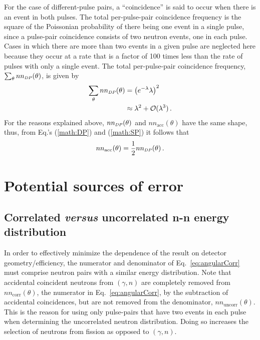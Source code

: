\documentclass[%
 reprint,
 amsmath,amssymb,
 aps,
 nofootinbib
]{revtex4-1}
\begin{document}
For the case of different-pulse pairs, a ``coincidence'' is said to occur when there is an event in both pulses.
The total per-pulse-pair coincidence frequency is the square of the Poissonian probability of there being one event in a single pulse, since a pulse-pair coincidence consists of two neutron events, one in each pulse.
Cases in which there are more than two events in a given pulse are neglected here because they occur at a rate that is a factor of 100 times less than the rate of pulses with only a single event.
The total per-pulse-pair coincidence frequency, $\sum_{\theta} nn_{\scaleto{DP}{4pt}}(\theta)$, is given by 
\begin{equation} \label{math:DP}
    \begin{split}
   \sum_{\theta} nn_{\scaleto{DP}{4pt}}(\theta)&= \left(e^{-\lambda}\lambda\right)^{2} \\
    &\approx \lambda^2 + \mathcal{O}(\lambda^3) \, .
    \end{split}
\end{equation}
For the reasons explained above, $nn_{\scaleto{DP}{4pt}}(\theta)$ and $nn_{\text{acc}}(\theta)$ have the same shape, thus, from Eq.'s (\ref{math:DP}) and (\ref{math:SP}) it follows that 
\begin{equation}
\label{eq:uncorr_DP}
nn_{\text{acc}}(\theta) = \frac{1}{2}nn_{\scaleto{DP}{4pt}}(\theta) \,.
\end{equation}

\section{Potential sources of error}
\subsection{Correlated \emph{versus} uncorrelated n-n energy distribution} 
\label{sec:n_n_erg_dist}
In order to effectively minimize the dependence of the result on detector geometry/efficiency, the numerator and denominator of Eq.~\ref{eq:angularCorr} must comprise neutron pairs with a similar energy distribution.
Note that accidental coincident neutrons from $(\gamma,n)$ are completely removed from $nn_{\text{corr}}(\theta)$, the numerator in Eq.~\ref{eq:angularCorr}, by the subtraction of accidental coincidences, but are not removed from the denominator, $nn_{\text{uncorr}}(\theta)$.
This is the reason for using only pulse-pairs that have two events in each pulse when determining the uncorrelated neutron distribution.
Doing so increases the selection of neutrons from fission as opposed to $(\gamma,n)$. 
\end{document}
